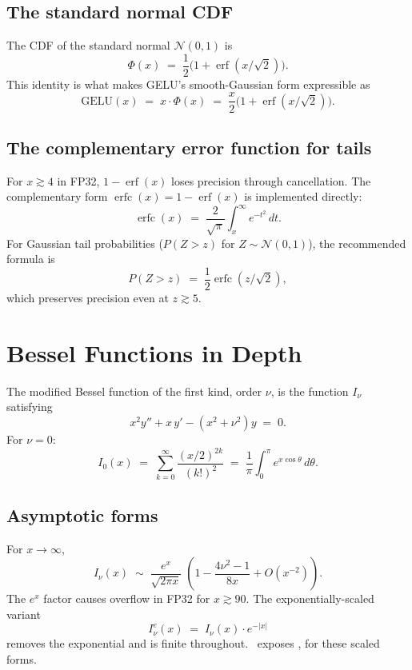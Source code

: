 \subsection{The standard normal CDF}
\label{ssec:special_functions:phi_via_erf}

The CDF of the standard normal $\mathcal{N}(0, 1)$ is
\[
\Phi(x) \;=\; \frac{1}{2}\bigl(1 + \operatorname{erf}(x/\sqrt{2})\bigr).
\]
This identity is what makes GELU's smooth-Gaussian form
expressible as
\[
\mathrm{GELU}(x) \;=\; x \cdot \Phi(x)
\;=\; \frac{x}{2}\bigl(1 + \operatorname{erf}(x/\sqrt{2})\bigr).
\]

\subsection{The complementary error function for tails}
\label{ssec:special_functions:erfc_tails}

For $x \gtrsim 4$ in FP32, $1 - \operatorname{erf}(x)$ loses
precision through cancellation. The complementary form
$\operatorname{erfc}(x) = 1 - \operatorname{erf}(x)$ is
implemented directly:
\[
\operatorname{erfc}(x) \;=\; \frac{2}{\sqrt{\pi}} \int_x^\infty e^{-t^2}\, dt.
\]
For Gaussian tail probabilities ($P(Z > z)$ for $Z \sim
\mathcal{N}(0, 1)$), the recommended formula is
\[
P(Z > z) \;=\; \frac{1}{2} \operatorname{erfc}(z / \sqrt{2}),
\]
which preserves precision even at $z \gtrsim 5$.

\section{Bessel Functions in Depth}
\label{sec:special_functions:bessel_depth}

The modified Bessel function of the first kind, order $\nu$, is
the function $I_\nu$ satisfying
\[
x^2 y'' + x\, y' - (x^2 + \nu^2) y \;=\; 0.
\]
For $\nu = 0$:
\[
I_0(x) \;=\; \sum_{k=0}^\infty \frac{(x/2)^{2k}}{(k!)^2}
        \;=\; \frac{1}{\pi} \int_0^\pi e^{x \cos\theta}\, d\theta.
\]

\subsection{Asymptotic forms}
\label{ssec:special_functions:bessel_asymptotic}

For $x \to \infty$,
\[
I_\nu(x) \;\sim\; \frac{e^x}{\sqrt{2\pi x}}
\;\left(1 - \frac{4\nu^2 - 1}{8x} + O(x^{-2})\right).
\]
The $e^x$ factor causes overflow in FP32 for $x \gtrsim 90$. The
exponentially-scaled variant
\[
I_\nu^{e}(x) \;=\; I_\nu(x) \cdot e^{-|x|}
\]
removes the exponential and is finite throughout. \Lucid\
exposes ,  for these scaled forms.

